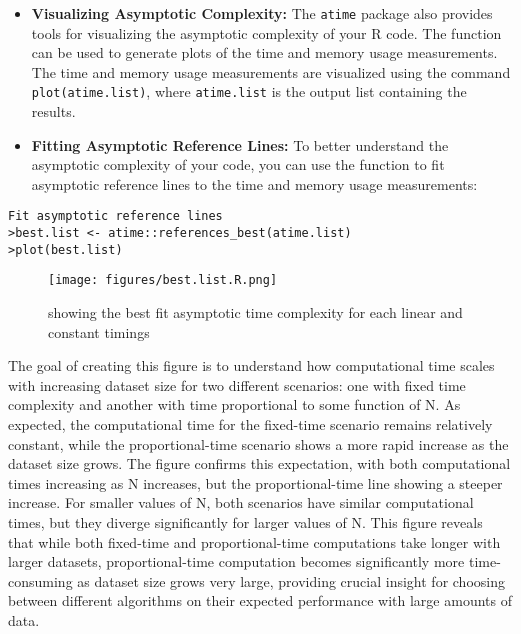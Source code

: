 \begin{itemize}
\item \textbf{Visualizing Asymptotic Complexity:} The \texttt{atime} package also provides tools for visualizing the asymptotic complexity of your R code. The  function can be used to generate plots of the time and memory usage measurements. The time and memory usage measurements are visualized using the command \texttt{plot(atime.list)}, where \texttt{atime.list} is the output list containing the results.

\vspace{0.1in}
\item \textbf{Fitting Asymptotic Reference Lines:} To better understand the asymptotic complexity of your code, you can use the  function to fit asymptotic reference lines to the time and memory usage measurements:

\end{itemize}

\begin{lstlisting}
Fit asymptotic reference lines
>best.list <- atime::references_best(atime.list)
>plot(best.list)
\end{lstlisting}
\vspace{0.1in}

\begin{figure}[H]
    \centering
    \texttt{[image: figures/best.list.R.png]}
    \caption{showing the best fit asymptotic time complexity for each linear and constant timings}
    \label{fig:label1}
\end{figure}

\noindent The goal of creating this figure is to understand how computational time scales with increasing dataset size for two different scenarios: one with fixed time complexity and another with time proportional to some function of N. As expected, the computational time for the fixed-time scenario remains relatively constant, while the proportional-time scenario shows a more rapid increase as the dataset size grows. The figure confirms this expectation, with both computational times increasing as N increases, but the proportional-time line showing a steeper increase. For smaller values of N, both scenarios have similar computational times, but they diverge significantly for larger values of N. This figure reveals that while both fixed-time and proportional-time computations take longer with larger datasets, proportional-time computation becomes significantly more time-consuming as dataset size grows very large, providing crucial insight for choosing between different algorithms on their expected performance with large amounts of data.\\

